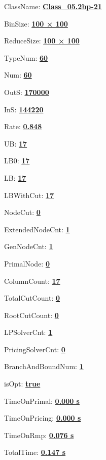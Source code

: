 \documentclass[11pt]{article}
\begin{document}
\pagestyle{empty}


ClassName: \underline{\textbf{Class_05.2bp-21}}
\par
BinSize: \underline{\textbf{100 × 100}}
\par
ReduceSize: \underline{\textbf{100 × 100}}
\par
TypeNum: \underline{\textbf{60}}
\par
Num: \underline{\textbf{60}}
\par
OutS: \underline{\textbf{170000}}
\par
InS: \underline{\textbf{144220}}
\par
Rate: \underline{\textbf{0.848}}
\par
UB: \underline{\textbf{17}}
\par
LB0: \underline{\textbf{17}}
\par
LB: \underline{\textbf{17}}
\par
LBWithCut: \underline{\textbf{17}}
\par
NodeCut: \underline{\textbf{0}}
\par
ExtendedNodeCnt: \underline{\textbf{1}}
\par
GenNodeCnt: \underline{\textbf{1}}
\par
PrimalNode: \underline{\textbf{0}}
\par
ColumnCount: \underline{\textbf{17}}
\par
TotalCutCount: \underline{\textbf{0}}
\par
RootCutCount: \underline{\textbf{0}}
\par
LPSolverCnt: \underline{\textbf{1}}
\par
PricingSolverCnt: \underline{\textbf{0}}
\par
BranchAndBoundNum: \underline{\textbf{1}}
\par
isOpt: \underline{\textbf{true}}
\par
TimeOnPrimal: \underline{\textbf{0.000 s}}
\par
TimeOnPricing: \underline{\textbf{0.000 s}}
\par
TimeOnRmp: \underline{\textbf{0.076 s}}
\par
TotalTime: \underline{\textbf{0.147 s}}
\par
\newpage


\end{document}

